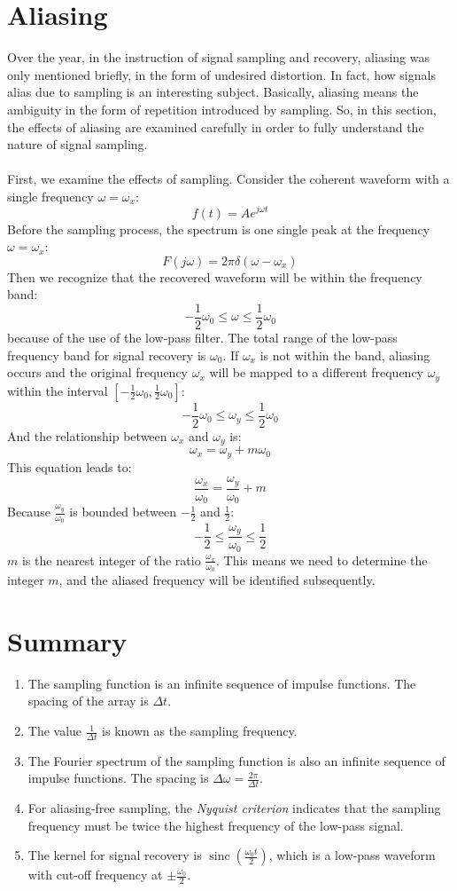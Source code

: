 \documentclass{article}
\begin{document}
\section{Aliasing}
Over the year, in the instruction of signal sampling and recovery, aliasing was only
mentioned briefly, in the form of undesired distortion. In fact, how signals alias due to
sampling is an interesting subject. Basically, aliasing means the ambiguity in the form of
repetition introduced by sampling. So, in this section, the effects of aliasing are examined
carefully in order to fully understand the nature of signal sampling.
\\
\\
First, we examine the effects of sampling. Consider the coherent waveform with a single
frequency \(\omega = \omega_x\):
\[
f(t) = Ae^{j\omega t}
\]
Before the sampling process, the spectrum is one single peak at the frequency \(\omega = \omega_x\):
\[
F(j\omega)=2\pi\delta(\omega-\omega_x)
\]
Then we recognize that the recovered waveform will be within the frequency band:
\[
-\frac{1}{2}\omega_0 \leq \omega \leq \frac{1}{2}\omega_0
\]
because of the use of the low-pass filter. The total range of the low-pass frequency band for signal recovery is \(\omega_0\). If \(\omega_x\) is not within the band, aliasing occurs and the original frequency \(\omega_x\) will be mapped to a different frequency \(\omega_y\) within the interval \([-\frac{1}{2}\omega_0, \frac{1}{2}\omega_0]\):
\[
-\frac{1}{2}\omega_0 \leq \omega_y \leq \frac{1}{2}\omega_0
\]
And the relationship between \(\omega_x\) and \(\omega_y\) is:
\[
\omega_x = \omega_y + m\omega_0
\]
This equation leads to:
\[
\frac{\omega_x}{\omega_0} = \frac{\omega_y}{\omega_0} + m
\]
Because \(\frac{\omega_y}{\omega_0}\) is bounded between \(-\frac{1}{2}\) and \(\frac{1}{2}\):
\[
-\frac{1}{2} \leq \frac{\omega_y}{\omega_0} \leq \frac{1}{2}
\]
\(m\) is the nearest integer of the ratio \(\frac{\omega_x}{\omega_0}\). This means we need to determine the integer \(m\), and the aliased frequency will be identified subsequently.

\newpage

\section*{Summary}
\begin{enumerate}
    \item The sampling function is an infinite sequence of impulse functions. The spacing of the
    array is \(\Delta t\).
    \item The value \(\frac{1}{\Delta t}\) is known as the sampling frequency. 
    \item The Fourier spectrum of the sampling function is also an infinite sequence of impulse
    functions. The spacing is \(\Delta\omega  = \frac{2\pi}{\Delta t}\).
    \item For aliasing-free sampling, the \textit{Nyquist criterion} indicates that the sampling frequency must be twice the highest frequency of the low-pass signal.
    \item The kernel for signal recovery is \(\operatorname{sinc}(\frac{\omega_0 t}{2})\), which is a low-pass waveform with cut-off frequency at \(\pm \frac{\omega_0}{2}\).
\end{enumerate}
\end{document}

